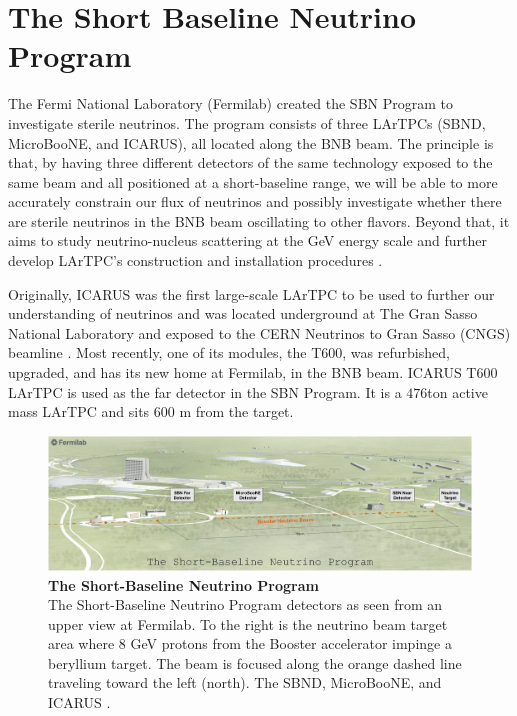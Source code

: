 \section{The Short Baseline Neutrino Program}

The Fermi National Laboratory (Fermilab) created the SBN Program to investigate sterile neutrinos. The program consists of three LArTPCs (SBND, MicroBooNE, and ICARUS), all located along the BNB beam. The principle is that, by having three different detectors of the same technology exposed to the same beam and all positioned at a short-baseline range, we will be able to more accurately constrain our flux of neutrinos and possibly investigate whether there are sterile neutrinos in the BNB beam oscillating to other flavors. Beyond that, it aims to study neutrino-nucleus scattering at the GeV energy scale and further develop LArTPC's construction and installation procedures \cite{SBN}.

Originally, ICARUS was the first large-scale LArTPC to be used to further our understanding of neutrinos and was located underground at The Gran Sasso National Laboratory and exposed to the CERN Neutrinos to Gran Sasso (CNGS) beamline \cite{ICARUS_proposal}. Most recently, one of its modules, the T600, was refurbished, upgraded, and has its new home at Fermilab, in the BNB beam. ICARUS T600 LArTPC is used as the far detector in the SBN Program. It is a $476$ton active mass LArTPC and sits $600$ m from the target. 

\begin{figure}[h!]
	\begin{center}
		\includegraphics[scale=0.32]{Figures/SBN.png}
		\caption[The Short-Baseline Neutrino Program]{\textbf{The Short-Baseline Neutrino Program}\\The Short-Baseline Neutrino Program detectors as seen from an upper view at Fermilab. To the right is the neutrino beam target area where $8$ GeV protons from the Booster accelerator impinge a beryllium target. The beam is focused along the orange dashed line traveling toward the left (north). The SBND, MicroBooNE, and ICARUS \cite{SBN}.
		}
		\label{sbn_program}
	\end{center}
\end{figure}

